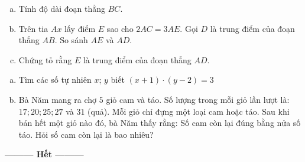 \begin{ex}
\begin{enumerate}[a)]
	\item Tính độ dài đoạn thẳng $BC$.
	\item Trên tia $Ax$ lấy điểm $E$ sao cho $2 A C=3 A E$. Gọi $D$ là trung điểm của đoạn thẳng $AB$. So sánh $AE$ và $AD$.
	\item Chứng tỏ rằng $E$ là trung điểm của đoạn thẳng $AD$.
	\end{enumerate}
\end{ex}  \begin{ex}
\begin{enumerate}[a)]
	\item Tìm các số tự nhiên $x$; $y$ biết $(x+1) \cdot(y-2)=3$
	\item Bà Năm mang ra chợ $5$ giỏ cam và táo. Số lượng trong mỗi giỏ lần lượt là: $17; 20; 25; 27$ và $31$ (quả). Mỗi giỏ chỉ đựng một loại cam hoặc táo. Sau khi bán hết một giỏ nào đó, bà Năm thấy rằng: Số cam còn lại đúng bằng nửa số táo. Hỏi số cam còn lại là bao nhiêu?
	\end{enumerate}
\end{ex}

\begin{center}
\textbf{\textbf{---------} Hết \textbf{---------}}
\end{center}
